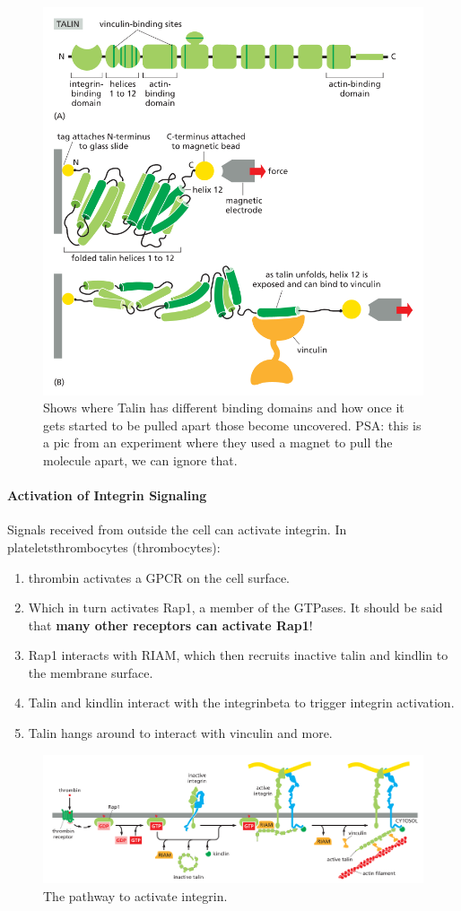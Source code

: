 \documentclass[../main.tex]{subfiles}
\begin{document}
\begin{figure}[H]
	\centering
	\includegraphics[width=0.6\linewidth]{int_tal}
	\caption{Shows where Talin has different binding domains and how once it gets started to be pulled apart those become uncovered. PSA: this is a pic from an experiment where they used a magnet to pull the molecule apart, we can ignore that.}
	\label{fig:inttal}
\end{figure}

\paragraph{Activation of Integrin Signaling}
Signals received from outside the cell can activate integrin. In \gls{plateletsthrombocytes} (thrombocytes):
\begin{enumerate}
	\item \gls{thrombin} activates a GPCR on the cell surface.
	\item Which in turn activates \gls{Rap1}, a member of the GTPases. It should be said that \textbf{many other receptors can activate Rap1}!
	\item Rap1 interacts with \gls{RIAM}, which then recruits inactive talin and \gls{kindlin} to the membrane surface.
	\item Talin and kindlin interact with the \gls{integrinbeta} to trigger integrin activation.
	\item Talin hangs around to interact with vinculin and more.
\end{enumerate} 

\begin{figure}[H]
	\centering
	\includegraphics[width=0.9\linewidth]{int_path}
	\caption{The pathway to activate integrin.}
	\label{fig:intpath}
\end{figure}
\end{document}
